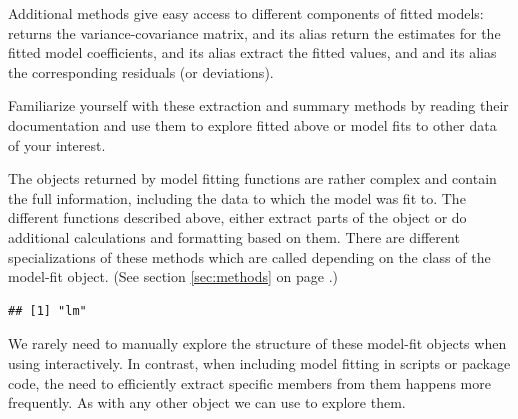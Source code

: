 \documentclass[krantz2]{krantz}\usepackage{knitr}
\begin{document}
Additional methods give easy access to different components of fitted models:  returns the variance-covariance matrix,  and its alias  return the estimates for the fitted model coefficients,  and its alias  extract the fitted values, and  and its alias  the corresponding residuals (or deviations).

\begin{playground}
Familiarize yourself with these extraction and summary methods by reading their documentation and use them to explore  fitted above or model fits to other data of your interest.
\end{playground}

\begin{explainbox}
The objects returned by model fitting functions are rather complex and contain the full information, including the data to which the model was fit to. The different functions described above, either extract parts of the object or do additional calculations and formatting based on them. There are different specializations of these methods which are called depending on the class of the model-fit object. (See section \ref{sec:methods} on page \pageref{sec:methods}.)

\begin{knitrout}\footnotesize
{}\color{fgcolor}\begin{kframe}
\begin{alltt}
\end{alltt}
\begin{verbatim}
## [1] "lm"
\end{verbatim}
\end{kframe}
\end{knitrout}

We rarely need to manually explore the structure of these model-fit objects when using \Rlang interactively. In contrast, when including model fitting in scripts or package code, the need to efficiently extract specific members from them happens more frequently. As with any other \Rlang object we can use  to explore them.

\begin{knitrout}\footnotesize
{}\color{fgcolor}\begin{kframe}
\begin{alltt}
  \hlstd{=} \hlstd{)} 
\end{alltt}
\end{kframe}
\end{knitrout}


\end{explainbox}
\end{document}
